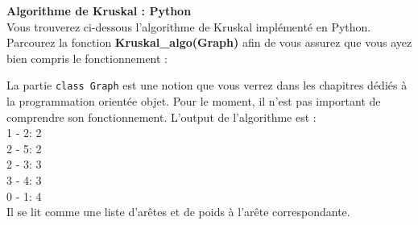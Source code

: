 \begin{Exercice}[15 minutes] \textbf{Algorithme de Kruskal : Python}\\
    Vous trouverez ci-dessous l'algorithme de Kruskal implémenté en Python. Parcourez la fonction \textbf{Kruskal\_algo(Graph)} afin de vous assurez que vous ayez bien compris le fonctionnement :\\
    
    \begin{conseil}
        La partie \lstinline{class Graph} est une notion que vous verrez dans les chapitres dédiés à la programmation orientée objet. Pour le moment, il n'est pas important de comprendre son fonctionnement. L'output de l'algorithme est : \\
        1 - 2: 2\\
        2 - 5: 2\\
        2 - 3: 3\\
        3 - 4: 3\\
        0 - 1: 4\\
        Il se lit comme une liste d'arêtes et de poids à l'arête correspondante.
    \end{conseil}
\end{Exercice}

\newpage

